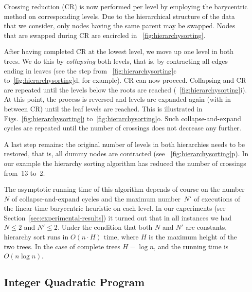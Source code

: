 \documentclass[runningheads,a4paper]{llncs}
\begin{document}
Crossing reduction (CR) is now performed per level by employing the
barycentric method on corresponding levels. Due to the hierarchical
structure of the data that we consider, only nodes having the
same parent may be swapped.  Nodes that
are swapped during CR are encircled in
\figurename~\ref{fig:hierarchysorting}.

After having completed CR at the lowest level, we move up one
level in both trees.  We do this by \emph{collapsing} both levels,
that is, by contracting all edges ending in leaves (see the step
from \figurename~\ref{fig:hierarchysorting}c
to~\ref{fig:hierarchysorting}d, for example).  CR can now proceed.
Collapsing and CR are repeated until the levels below the roots are
reached (\figurename~\ref{fig:hierarchysorting}i).  At this point,
the process is reversed and levels are expanded again (with
in-between CR) until the leaf levels are reached.  This is
illustrated in Figs.~\ref{fig:hierarchysorting}j
to~\ref{fig:hierarchysorting}o. Such collapse-and-expand cycles are 
repeated until the number of crossings does not decrease any
further.

A last step remains: the original number of levels in both
hierarchies needs to be restored, that is, all dummy
nodes are contracted (see \figurename~\ref{fig:hierarchysorting}p).
In our example the hierarchy sorting algorithm has reduced the
number of crossings from~13 to~2.

The asymptotic running time of this algorithm depends of course on the
number~$N$ of collapse-and-expand cycles and the maximum number~$N'$
of executions of the linear-time barycentric heuristic on each level.
In our experiments (see Section~\ref{sec:experimental-results}) it
turned out that in all instances we had $N \le 2$ and $N' \le 2$.
Under the condition that both $N$ and $N'$ are constants, hierarchy
sort runs in $O(n \cdot H)$ time, where $H$ is the maximum height of
the two trees. In the case of complete trees $H= \log n$, and the
running time is $O(n \log n)$.

\subsection{Integer Quadratic Program}\label{sec:int-quad-prog}
\end{document}
